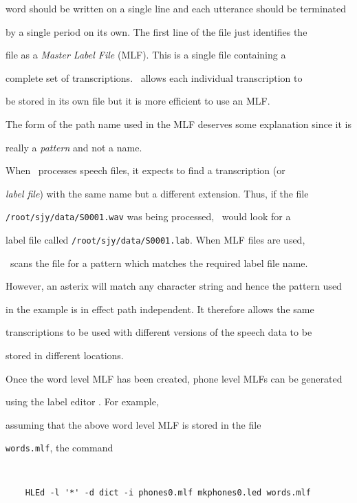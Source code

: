word should be written on a single line and each utterance should be terminated


by a single period on its own.  The first line of the file just identifies the


file as a \textit{Master Label File} (MLF).  This is a single file containing a


complete set of transcriptions.  \HTK\ allows each individual transcription to


be stored in its own file but it is more efficient to use an MLF.







The form of the path name used in the MLF deserves some explanation since it is


really a \textit{pattern} and not a name.


When \HTK\ processes speech files, it expects to find a transcription (or 


{\it label file}) with the same name but a different extension.  Thus, if the file


\texttt{/root/sjy/data/S0001.wav} was being processed, \HTK\ would look for a


label file called \texttt{/root/sjy/data/S0001.lab}.  When MLF files are used,


\HTK\ scans the file for a pattern which matches the required label file name.


However, an asterix will match any character string and hence the pattern used


in the example is in effect path independent.  It therefore allows the same


transcriptions to be used with different versions of the speech data to be


stored in different locations.





Once the word level MLF has been created, phone level MLFs can be generated


using the label editor . For example,


assuming that the above word level MLF is stored in the file


\texttt{words.mlf}, the command


\begin{verbatim}


    HLEd -l '*' -d dict -i phones0.mlf mkphones0.led words.mlf


\end{verbatim}


